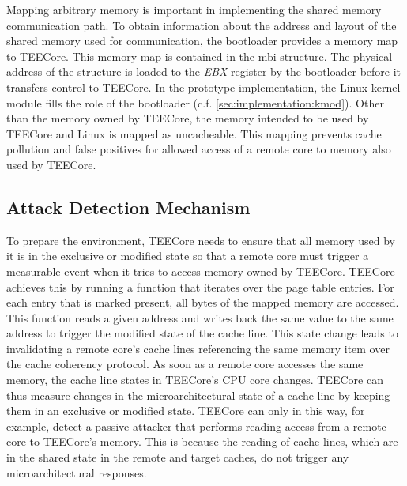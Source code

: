 Mapping arbitrary memory is important in implementing the shared memory
communication path. To obtain information about the address and layout of the
shared memory used for communication, the bootloader provides a memory map to
TEECore. This memory map is contained in the \gls{mbi} structure. The physical
address of the structure is loaded to the \textit{EBX} register by the
bootloader before it transfers control to TEECore. In the prototype
implementation, the Linux kernel module fills the role of the bootloader (c.f.
\ref{sec:implementation:kmod}). Other than the memory owned by TEECore, the
memory intended to be used by TEECore and Linux is mapped as uncacheable. This
mapping prevents cache pollution and false positives for allowed access of a
remote core to memory also used by TEECore.

\subsection{Attack Detection Mechanism}
\label{sec:implementation:teeKernel:pmcs}
To prepare the environment, TEECore needs to ensure that all memory used by it
is in the exclusive or modified state so that a remote core must trigger a
measurable event when it tries to access memory owned by TEECore. TEECore
achieves this by running a function that iterates over the page table entries.
For each entry that is marked present, all bytes of the mapped memory are
accessed. This function reads a given address and writes back the same value to
the same address to trigger the modified state of the cache line. This state
change leads to invalidating a remote core's cache lines referencing the same
memory item over the cache coherency protocol. As soon as a remote core accesses
the same memory, the cache line states in TEECore's CPU core changes. TEECore can
thus measure changes in the microarchitectural state of a cache line by keeping
them in an exclusive or modified state. TEECore can only in this way, for
example, detect a passive attacker that performs reading access from a remote
core to TEECore's memory. This is because the reading of cache lines, which are
in the shared state in the remote and target caches, do not trigger any
microarchitectural responses.\\

